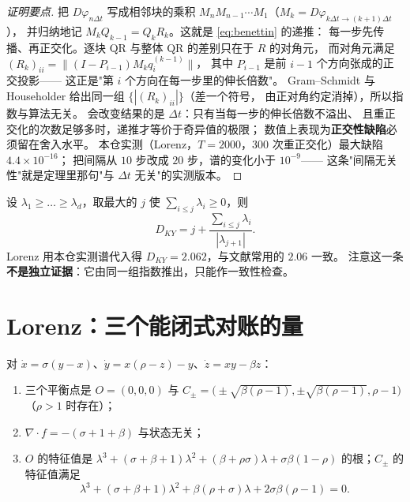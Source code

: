 \begin{proof}[证明要点]
把 $D\varphi_{n\Delta t}$ 写成相邻块的乘积
$M_nM_{n-1}\cdots M_1$（$M_k=D\varphi_{k\Delta t\to(k+1)\Delta t}$），
并归纳地记 $M_kQ_{k-1}=Q_kR_k$。这就是 \eqref{eq:benettin} 的递推：
每一步先传播、再正交化。逐块 QR 与整体 QR 的差别只在于 $R$ 的对角元，
而对角元满足 $(R_k)_{ii}=\|(I-P_{i-1})M_kq^{(k-1)}_i\|$，
其中 $P_{i-1}$ 是前 $i-1$ 个方向张成的正交投影——
这正是"第 $i$ 个方向在每一步里的伸长倍数"。
Gram--Schmidt 与 Householder 给出同一组 $\{|(R_k)_{ii}|\}$（差一个符号，
由正对角约定消掉），所以指数与算法无关。
会改变结果的是 $\Delta t$：只有当每一步的伸长倍数不溢出、
且重正交化的次数足够多时，递推才等价于奇异值的极限；
数值上表现为\textbf{正交性缺陷}必须留在舍入水平。
本仓实测（Lorenz，$T=2000$，$300$ 次重正交化）最大缺陷 $4.4\times10^{-16}$；
把间隔从 $10$ 步改成 $20$ 步，谱的变化小于 $10^{-9}$——
这条"间隔无关性"就是定理里那句"与 $\Delta t$ 无关"的实测版本。
\end{proof}

\begin{corollary}
设 $\lambda_1\ge\dots\ge\lambda_d$，取最大的 $j$ 使 $\sum_{i\le j}\lambda_i\ge0$，则
\begin{equation}
  D_{KY}=j+\frac{\sum_{i\le j}\lambda_i}{|\lambda_{j+1}|}.
  \label{eq:ky}
\end{equation}
Lorenz 用本仓实测谱代入得 $D_{KY}=2.062$，与文献常用的 $2.06$ 一致。
注意这一条\textbf{不是独立证据}：它由同一组指数推出，只能作一致性检查。
\end{corollary}

\section{Lorenz：三个能闭式对账的量}

\begin{theorem}
\label{thm:lorenz-fp}
对 $\dot x=\sigma(y-x)$、$\dot y=x(\rho-z)-y$、$\dot z=xy-\beta z$：
\begin{enumerate}
  \item 三个平衡点是 $O=(0,0,0)$ 与
        $C_\pm=\bigl(\pm\sqrt{\beta(\rho-1)},\pm\sqrt{\beta(\rho-1)},\rho-1\bigr)$
        （$\rho>1$ 时存在）；
  \item $\nabla\!\cdot\!f=-(\sigma+1+\beta)$ 与状态无关；
  \item $O$ 的特征值是 $\lambda^3+(\sigma+\beta+1)\lambda^2+(\beta+\rho\sigma)\lambda
        +\sigma\beta(1-\rho)$ 的根；$C_\pm$ 的特征值满足
        \begin{equation}
          \lambda^3+(\sigma+\beta+1)\lambda^2+\beta(\rho+\sigma)\lambda
          +2\sigma\beta(\rho-1)=0 .
          \label{eq:lorenz-char}
        \end{equation}
\end{enumerate}
\end{theorem}

